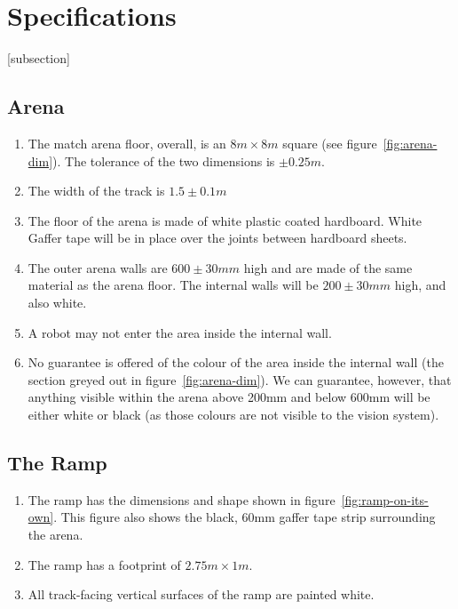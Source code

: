\section{Specifications}
[subsection]
\newcommand{\rcnii}{\stepcounter{rulei}\arabic{section}.\arabic{subsection}.\arabic{rulei}}
\renewcommand{\labelenumi}{\rcnii}

\subsection{Arena}
\begin{enumerate}
\item The match arena floor, overall, is an $8m \times 8m$ square (see figure~\ref{fig:arena-dim}).
 The tolerance of the two dimensions is $\pm0.25m$.
\item The width of the track is $1.5\pm0.1m$
\item The floor of the arena is made of white plastic coated hardboard.
 White Gaffer tape will be in place over the joints between hardboard sheets.
\item The outer arena walls are $600\pm30mm$ high and are made of the same material as the arena floor.
 The internal walls will be $200\pm30mm$ high, and also white.
\item A robot may not enter the area inside the internal wall.
\item No guarantee is offered of the colour of the area inside the internal wall (the section greyed out in figure~\ref{fig:arena-dim}).
 We can guarantee, however, that anything visible within the arena above 200mm and below 600mm will be either white or black (as those colours are not visible to the vision system).
\end{enumerate}

\subsection{The Ramp}
\label{ramp}
\begin {enumerate}
\item The ramp has the dimensions and shape shown in figure~\ref{fig:ramp-on-its-own}.
 This figure also shows the black, 60mm gaffer tape strip surrounding the arena.
\item The ramp has a footprint of $2.75m \times 1m$.
\item All track-facing vertical surfaces of the ramp are painted white.
\end {enumerate}

